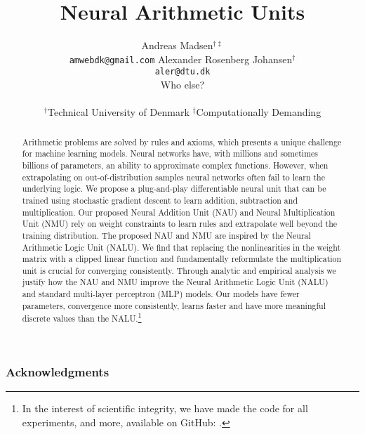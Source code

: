 \documentclass{article}
\title{Neural Arithmetic Units}
\author{%
  Andreas Madsen$^{\dag\ddag}$ \\
  \texttt{amwebdk@gmail.com}
  \AND
  Alexander Rosenberg Johansen$^{\dag}$ \\
  \texttt{aler@dtu.dk} \\
  \AND
  Who else? \\
  \\
$^\dag$Technical University of Denmark \quad
$^\ddag$Computationally Demanding
}
\begin{document}
\StopCensoring %

\maketitle

\begin{abstract}
Arithmetic problems are solved by rules and axioms, which presents a unique challenge for machine learning models.
Neural networks have, with millions and sometimes billions of parameters, an ability to approximate complex functions.
However, when extrapolating on out-of-distribution samples neural networks often fail to learn the underlying logic.
We propose a plug-and-play differentiable neural unit that can be trained using stochastic gradient descent to learn addition, subtraction and multiplication.
Our proposed Neural Addition Unit (NAU) and Neural Multiplication Unit (NMU) rely on weight constraints to learn rules and extrapolate well beyond the training distribution.
The proposed NAU and NMU are inspired by the Neural Arithmetic Logic Unit (NALU).
We find that replacing the nonlinearities in the weight matrix with a clipped linear function and fundamentally reformulate the multiplication unit is crucial for converging consistently.
Through analytic and empirical analysis we justify how the NAU and NMU improve the Neural Arithmetic Logic Unit (NALU) and standard multi-layer perceptron (MLP) models.
Our models have fewer parameters, convergence more consistently, learns faster and have more meaningful discrete values than the NALU.\footnote{In the interest of scientific integrity, we have made the code for all experiments, and more, available on GitHub: .}
\end{abstract}







\subsubsection*{Acknowledgments}





\newpage
\appendix



\end{document}
